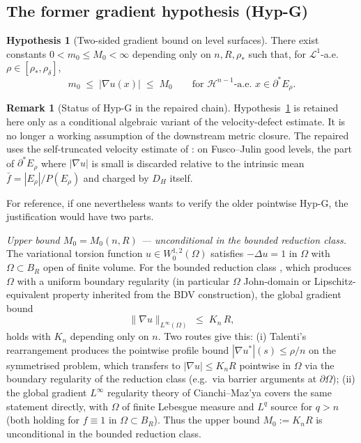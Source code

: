 \documentclass[11pt]{article}
\theoremstyle{definition}
\newtheorem{remark}[theorem]{Remark}
\newtheorem{hypothesis}[theorem]{Hypothesis}
\newcommand{\Om}{\Omega}
\newcommand{\rstar}{\rho_{*}}
\begin{document}
\subsection{The former gradient hypothesis (Hyp-G)}\label{ssec:hypG}

\begin{hypothesis}[Two-sided gradient bound on level surfaces]
\label{hyp:G}
There exist constants $0<m_{0}\le M_{0}<\infty$ depending only on
$n,R,\rstar$ such that, for $\mathcal L^{1}$-a.e.\
$\rho\in[\rstar,\rho_{\delta}]$,
\[
   m_{0}\;\le\;|\nabla u(x)|\;\le\;M_{0}
   \qquad\text{for }\mathcal H^{n-1}\text{-a.e.\ }
   x\in\partial^{*}E_{\rho}.
\]
\end{hypothesis}

\begin{remark}[Status of Hyp-G in the repaired chain]
\label{rem:hypG-validity}
Hypothesis~\ref{hyp:G} is retained here only as a conditional algebraic
variant of the velocity-defect estimate.  It is no longer a working
assumption of the downstream metric closure.  The repaired
\cite{WeightedMetricTrace} uses the self-truncated velocity estimate of
\cite{TrimmedVelocityRepair}: on Fusco--Julin good levels, the part of
$\partial^*E_\rho$ where $|\nabla u|$ is small is discarded relative to
the intrinsic mean $\bar f=|E_\rho|/P(E_\rho)$ and charged by $D_H$
itself.

For reference, if one nevertheless wants to verify the older pointwise
Hyp-G, the justification would have two parts.

\emph{Upper bound $M_{0}=M_{0}(n,R)$ --- unconditional in the bounded
reduction class.}
The variational torsion function $u\in W^{1,2}_{0}(\Om)$ satisfies
$-\Delta u=1$ in $\Om$ with $\Om\subset B_{R}$ open of finite volume.
For the bounded reduction class \cite[Lemma~5.3]{GlobalAssembly},
which produces $\Om$ with a uniform boundary regularity (in
particular $\Om$ John-domain or Lipschitz-equivalent property
inherited from the BDV construction), the global gradient bound
\[
   \|\nabla u\|_{L^{\infty}(\Om)}\;\le\;K_{n}\,R,
\]
holds with $K_{n}$ depending only on $n$.  Two routes give this:
(i) Talenti's rearrangement \cite{Talenti1976} produces the pointwise
profile bound $|\nabla u^{*}|(s)\le\rho/n$ on the symmetrised problem,
which transfers to $|\nabla u|\le K_{n}R$ pointwise in $\Om$ via the
boundary regularity of the reduction class (e.g.\ via barrier
arguments at $\partial\Om$);
(ii) the global gradient $L^{\infty}$ regularity theory of Cianchi--Maz'ya
\cite[Thm.~1.1, applied to the linear case $p=2$]{CianchiMaz'ya2011}
covers the same statement directly, with $\Om$ of finite Lebesgue
measure and $L^{q}$ source for $q>n$ (both holding for $f\equiv 1$ in
$\Om\subset B_{R}$).
Thus the upper bound $M_{0}:=K_{n}R$ is unconditional in the bounded
reduction class.


\end{remark}
\end{document}
